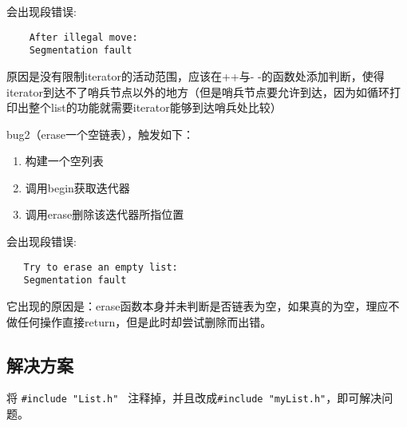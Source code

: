 \documentclass[UTF8]{ctexart}
\begin{document}
会出现段错误:
\begin{verbatim}
    After illegal move:
    Segmentation fault
\end{verbatim}

原因是没有限制iterator的活动范围，应该在++与- -的函数处添加判断，使得iterator到达不了哨兵节点以外的地方（但是哨兵节点要允许到达，因为如循环打印出整个list的功能就需要iterator能够到达哨兵处比较）\


bug2（erase一个空链表），触发如下：

\begin{enumerate}
    \item 构建一个空列表
    \item 调用begin获取迭代器
    \item 调用erase删除该迭代器所指位置
\end{enumerate}

会出现段错误:
\begin{verbatim}
   Try to erase an empty list:
   Segmentation fault
\end{verbatim}

它出现的原因是：erase函数本身并未判断是否链表为空，如果真的为空，理应不做任何操作直接return，但是此时却尝试删除而出错。\

\subsection{解决方案}

将 \texttt{\#include "List.h" } 注释掉，并且改成\texttt{\#include "myList.h"}，即可解决问题。
\end{document}
